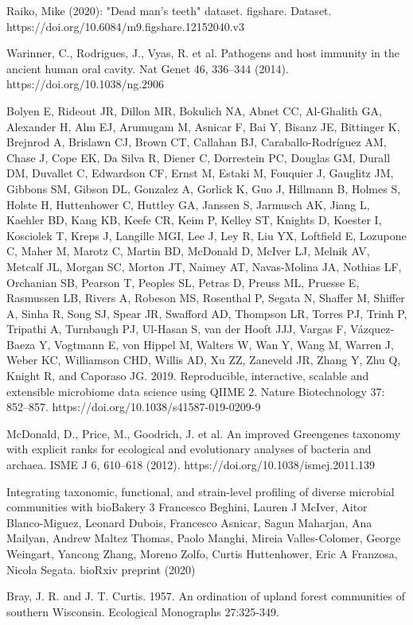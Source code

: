 \documentclass{article}
\begin{document}
\begin{thebibliography}{9}



Raiko, Mike (2020): "Dead man's teeth" dataset. figshare. Dataset. https://doi.org/10.6084/m9.figshare.12152040.v3 


	 Warinner, C., Rodrigues, J., Vyas, R. et al. Pathogens and host immunity in the ancient human oral cavity. Nat Genet 46, 336–344 (2014). https://doi.org/10.1038/ng.2906
	
	
	Bolyen E, Rideout JR, Dillon MR, Bokulich NA, Abnet CC, Al-Ghalith GA, Alexander H, Alm EJ, Arumugam M, Asnicar F, Bai Y, Bisanz JE, Bittinger K, Brejnrod A, Brislawn CJ, Brown CT, Callahan BJ, Caraballo-Rodríguez AM, Chase J, Cope EK, Da Silva R, Diener C, Dorrestein PC, Douglas GM, Durall DM, Duvallet C, Edwardson CF, Ernst M, Estaki M, Fouquier J, Gauglitz JM, Gibbons SM, Gibson DL, Gonzalez A, Gorlick K, Guo J, Hillmann B, Holmes S, Holste H, Huttenhower C, Huttley GA, Janssen S, Jarmusch AK, Jiang L, Kaehler BD, Kang KB, Keefe CR, Keim P, Kelley ST, Knights D, Koester I, Kosciolek T, Kreps J, Langille MGI, Lee J, Ley R, Liu YX, Loftfield E, Lozupone C, Maher M, Marotz C, Martin BD, McDonald D, McIver LJ, Melnik AV, Metcalf JL, Morgan SC, Morton JT, Naimey AT, Navas-Molina JA, Nothias LF, Orchanian SB, Pearson T, Peoples SL, Petras D, Preuss ML, Pruesse E, Rasmussen LB, Rivers A, Robeson MS, Rosenthal P, Segata N, Shaffer M, Shiffer A, Sinha R, Song SJ, Spear JR, Swafford AD, Thompson LR, Torres PJ, Trinh P, Tripathi A, Turnbaugh PJ, Ul-Hasan S, van der Hooft JJJ, Vargas F, Vázquez-Baeza Y, Vogtmann E, von Hippel M, Walters W, Wan Y, Wang M, Warren J, Weber KC, Williamson CHD, Willis AD, Xu ZZ, Zaneveld JR, Zhang Y, Zhu Q, Knight R, and Caporaso JG. 2019. Reproducible, interactive, scalable and extensible microbiome data science using QIIME 2. Nature Biotechnology 37: 852–857. https://doi.org/10.1038/s41587-019-0209-9 
	
	
	McDonald, D., Price, M., Goodrich, J. et al. An improved Greengenes taxonomy with explicit ranks for ecological and evolutionary analyses of bacteria and archaea. ISME J 6, 610–618 (2012). https://doi.org/10.1038/ismej.2011.139
	
Integrating taxonomic, functional, and strain-level profiling of diverse microbial communities with bioBakery 3 Francesco Beghini, Lauren J McIver, Aitor Blanco-Miguez, Leonard Dubois, Francesco Asnicar, Sagun Maharjan, Ana Mailyan, Andrew Maltez Thomas, Paolo Manghi, Mireia Valles-Colomer, George Weingart, Yancong Zhang, Moreno Zolfo, Curtis Huttenhower, Eric A Franzosa, Nicola Segata. bioRxiv preprint (2020)
	
	
	Bray, J. R. and J. T. Curtis. 1957. An ordination of upland forest communities of southern Wisconsin. Ecological Monographs 27:325-349.
	
	
\end{thebibliography}

 
\end{document}
